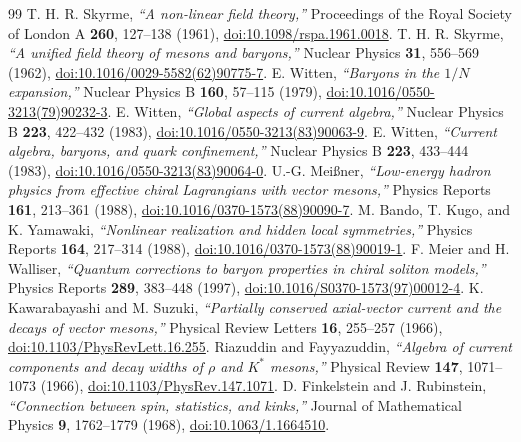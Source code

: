 \documentclass[10pt,aps,prd,twocolumn,superscriptaddress,nofootinbib,floatfix,longbibliography,showkeys]{revtex4-2}
\begin{document}
\begin{thebibliography}{99}
 T. H. R. Skyrme, \textit{``A non-linear field theory,''} Proceedings of the Royal Society of London A \textbf{260}, 127--138 (1961), \href{https://doi.org/10.1098/rspa.1961.0018}{doi:10.1098/rspa.1961.0018}.
 T. H. R. Skyrme, \textit{``A unified field theory of mesons and baryons,''} Nuclear Physics \textbf{31}, 556--569 (1962), \href{https://doi.org/10.1016/0029-5582(62)90775-7}{doi:10.1016/0029-5582(62)90775-7}.
 E. Witten, \textit{``Baryons in the $1/N$ expansion,''} Nuclear Physics B \textbf{160}, 57--115 (1979), \href{https://doi.org/10.1016/0550-3213(79)90232-3}{doi:10.1016/0550-3213(79)90232-3}.
 E. Witten, \textit{``Global aspects of current algebra,''} Nuclear Physics B \textbf{223}, 422--432 (1983), \href{https://doi.org/10.1016/0550-3213(83)90063-9}{doi:10.1016/0550-3213(83)90063-9}.
 E. Witten, \textit{``Current algebra, baryons, and quark confinement,''} Nuclear Physics B \textbf{223}, 433--444 (1983), \href{https://doi.org/10.1016/0550-3213(83)90064-0}{doi:10.1016/0550-3213(83)90064-0}.
 U.-G. Mei\ss{}ner, \textit{``Low-energy hadron physics from effective chiral Lagrangians with vector mesons,''} Physics Reports \textbf{161}, 213--361 (1988), \href{https://doi.org/10.1016/0370-1573(88)90090-7}{doi:10.1016/0370-1573(88)90090-7}.
 M. Bando, T. Kugo, and K. Yamawaki, \textit{``Nonlinear realization and hidden local symmetries,''} Physics Reports \textbf{164}, 217--314 (1988), \href{https://doi.org/10.1016/0370-1573(88)90019-1}{doi:10.1016/0370-1573(88)90019-1}.
 F. Meier and H. Walliser, \textit{``Quantum corrections to baryon properties in chiral soliton models,''} Physics Reports \textbf{289}, 383--448 (1997), \href{https://doi.org/10.1016/S0370-1573(97)00012-4}{doi:10.1016/S0370-1573(97)00012-4}.
 K. Kawarabayashi and M. Suzuki, \textit{``Partially conserved axial-vector current and the decays of vector mesons,''} Physical Review Letters \textbf{16}, 255--257 (1966), \href{https://doi.org/10.1103/PhysRevLett.16.255}{doi:10.1103/PhysRevLett.16.255}.
 Riazuddin and Fayyazuddin, \textit{``Algebra of current components and decay widths of $\rho$ and $K^*$ mesons,''} Physical Review \textbf{147}, 1071--1073 (1966), \href{https://doi.org/10.1103/PhysRev.147.1071}{doi:10.1103/PhysRev.147.1071}.
 D. Finkelstein and J. Rubinstein, \textit{``Connection between spin, statistics, and kinks,''} Journal of Mathematical Physics \textbf{9}, 1762--1779 (1968), \href{https://doi.org/10.1063/1.1664510}{doi:10.1063/1.1664510}.

\end{thebibliography}
\end{document}

